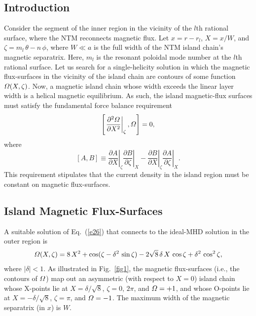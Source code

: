 \documentclass[12pt,prb,aps]{revtex4-1}
\begin{document}
\subsection{Introduction}
Consider the segment of the inner region in the vicinity of the $l$th rational surface, where the NTM reconnects magnetic flux. 
Let $x=r-r_{l}$, $X=x/W$, and $\zeta=m_{l}\,\theta-n\,\phi$, where $W\ll a$ is the full width  of the NTM island chain's magnetic separatrix. 
Here, $m_l$ is the resonant poloidal mode number at the $l$th rational surface. 
Let us search for a single-helicity solution in which the magnetic flux-surfaces in the vicinity of the island chain are contours of some function ${\mit\Omega}(X,\zeta)$.
Now, a magnetic island chain whose width exceeds the linear layer width is a helical magnetic equilibrium.\cite{ntm1} As such, the island magnetic-flux surfaces must satisfy the fundamental
force balance requirement\,\cite{island}
\begin{equation}\label{e26}
\left[\left.\frac{\partial^2{\mit\Omega}}{\partial X^2}\right|_\zeta,{\mit\Omega}\right]=0,
\end{equation}
where
\begin{equation}\label{poisson}
[A,B] \equiv \left.\frac{\partial A}{\partial X}\right|_\zeta \left.\frac{\partial B}{\partial\zeta}\right|_X- \left.\frac{\partial B}{\partial X}\right|_\zeta \left.\frac{\partial A}{\partial\zeta}\right|_X.
\end{equation}
This requirement stipulates that the current density in the island region must be constant on magnetic flux-surfaces.\cite{ntm1}

\subsection{Island Magnetic Flux-Surfaces}
A suitable solution of Eq.~(\ref{e26}) that connects to the ideal-MHD solution in the outer region is\,\cite{island}
\begin{equation}\label{e45}
{\mit\Omega}(X,\zeta) = 8\,X^2 + \cos(\zeta-\delta^2\,\sin\zeta) - 2\sqrt{8}\,\delta\,X\,\cos\zeta+\delta^2\,\cos^2\zeta,
\end{equation}
where $|\delta|<1$.  As illustrated in Fig.~\ref{fig1}, the magnetic flux-surfaces  (i.e., the contours of ${\mit\Omega}$) map out an
asymmetric (with respect to $X=0$) island chain whose 
X-points lie at $X=\delta/\sqrt{8}$, $\zeta = 0$, $2\pi$, and ${\mit\Omega}=+1$,  and whose  O-points lie at
$X=-\delta/\sqrt{8}$,  $\zeta=\pi$, and ${\mit\Omega}=-1$. The maximum width of the magnetic separatrix (in $x$) is $W$. 
\end{document}
